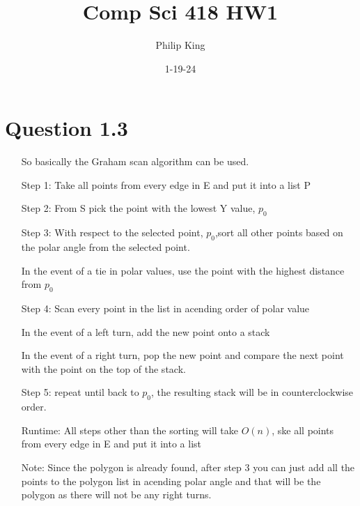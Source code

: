 \documentclass[12pt]{article}
\title{Comp Sci 418 HW1}
\author{Philip King}
\date{1-19-24}
\begin{document}
\maketitle
\section*{Question 1.3}
\begin{itemize}
    \item[] So basically the Graham scan algorithm can be used.
    \item[Step 1:] Take all points from every edge in E and put it into a list P
    \item[Step 2:] From S pick the point with the lowest Y value, $p_0$
    \item[Step 3:] With respect to the selected point, $p_0$,sort all other points based on the polar angle from the selected point.
    \item[] In the event of a tie in polar values, use the point with the highest distance from $p_0$
    \item[Step 4:] Scan every point in the list in acending order of polar value
    \item[] In the event of a left turn, add the new point onto a stack
    \item[] In the event of a right turn, pop the new point and compare the next point with the point on the top of the stack.
    \item[Step 5:] repeat until back to $p_0$, the resulting stack will be in counterclockwise order. 
    \item[Runtime:] All steps other than the sorting will take $O(n)$, ske all points from every edge in E and put it into a list
    \item[Note:] Since the polygon is already found, after step 3 you can just add all the points to the polygon list in acending polar angle and that will be the polygon as there will not be any right turns. 
\end{itemize}
\end{document}
